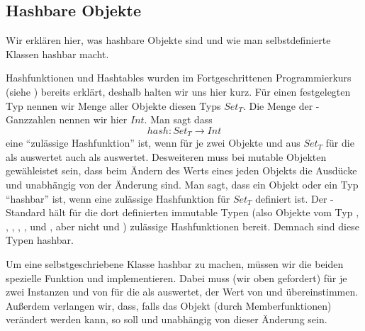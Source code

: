 \subsection{Hashbare Objekte}
\label{section:klassen:hashbare_objekte}
Wir erklären hier, was hashbare Objekte sind und wie man selbstdefinierte Klassen hashbar macht.

Hashfunktionen und Hashtables wurden im Fortgeschrittenen Programmierkurs (siehe \cite{joelixC}) bereits erklärt, deshalb halten wir uns hier kurz.
Für einen festgelegten Typ  nennen wir Menge aller Objekte diesen Typs $Set_T$.
Die Menge der \Python-Ganzzahlen nennen wir hier $Int$.
Man sagt dass
\[
  hash \colon Set_T \to Int
\]
eine ``zulässige Hashfunktion'' ist, wenn für je zwei Objekte  und  aus $Set_T$ für die  als  auswertet auch  als  auswertet.
Desweiteren muss bei mutable Objekten gewähleistet sein, dass beim Ändern des Werts eines jeden Objekts  die Ausdücke  und  unabhängig von der Änderung sind.
Man sagt, dass ein Objekt oder ein Typ  ``hashbar'' ist, wenn eine zulässige Hashfunktion für $Set_T$ definiert ist.
Der \Python-Standard hält für die dort definierten immutable Typen (also Objekte vom Typ , , , , ,  und ,
aber nicht  und ) zulässige Hashfunktionen bereit.
Demnach sind diese Typen hashbar.

Um eine selbstgeschriebene Klasse  hashbar zu machen, müssen wir die beiden spezielle Funktion  und  implementieren.
Dabei muss (wir oben gefordert) für je zwei Instanzen  und  von  für die  als  auswertet, der Wert von  und  übereinstimmen.
Außerdem verlangen wir, dass, falls das Objekt (durch Memberfunktionen) verändert werden kann, so soll  und  unabhängig von dieser Änderung sein.

